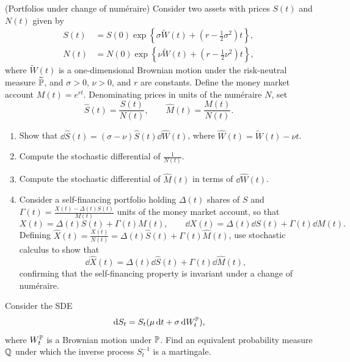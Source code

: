 \begin{problem}
    (Portfolios under change of num\'eraire) Consider two assets with prices $S(t)$ and $N(t)$ given by
    \begin{align*}
    S(t) &= S(0)\exp\!\left\{\sigma\widetilde{W}(t) + \left(r - \frac{1}{2}\sigma^2\right)t\right\}, \\
    N(t) &= N(0)\exp\!\left\{\nu\widetilde{W}(t) + \left(r - \frac{1}{2}\nu^2\right)t\right\},
    \end{align*}
    where $\widetilde{W}(t)$ is a one-dimensional Brownian motion under the risk-neutral measure $\widetilde{\mathbb{P}}$, and $\sigma > 0$, $\nu > 0$, and $r$ are constants. Define the money market account $M(t) = e^{rt}$. Denominating prices in units of the num\'eraire $N$, set
    \[
    \widehat{S}(t) = \frac{S(t)}{N(t)}, \qquad \widehat{M}(t) = \frac{M(t)}{N(t)}.
    \]
    \begin{enumerate}
        \item Show that $\dd\widehat{S}(t) = (\sigma - \nu)\widehat{S}(t)\dd\widehat{W}(t)$, where $\widehat{W}(t) = \widetilde{W}(t) - \nu t$.
        \item Compute the stochastic differential of $\frac{1}{N(t)}$.
        \item Compute the stochastic differential of $\widehat{M}(t)$ in terms of $\dd\widehat{W}(t)$.
        \item Consider a self-financing portfolio holding $\Delta(t)$ shares of $S$ and $\Gamma(t) = \frac{X(t) - \Delta(t)S(t)}{M(t)}$ units of the money market account, so that
        \[
        X(t) = \Delta(t)S(t) + \Gamma(t)M(t), \qquad \dd X(t) = \Delta(t)\dd S(t) + \Gamma(t)\dd M(t).
        \]
        Defining $\widehat{X}(t) = \frac{X(t)}{N(t)} = \Delta(t)\widehat{S}(t) + \Gamma(t)\widehat{M}(t)$, use stochastic calculus to show that
        \[
        \dd\widehat{X}(t) = \Delta(t)\dd\widehat{S}(t) + \Gamma(t)\dd\widehat{M}(t),
        \]
        confirming that the self-financing property is invariant under a change of num\'eraire.
    \end{enumerate}
\end{problem}

\begin{problem}
    Consider the SDE
    \[
    \,\mathrm{d} S_t = S_t(\mu\,\mathrm{d} t + \sigma\,\mathrm{d} W_t^{\mathbb{P}}),
    \]
    where $W_t^{\mathbb{P}}$ is a Brownian motion under $\mathbb{P}$. Find an equivalent probability measure $\mathbb{Q}$ under which the inverse process $S_t^{-1}$ is a martingale.
\end{problem}

